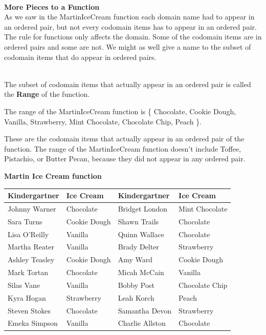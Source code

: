 \documentclass{ximera}
\begin{document}
\quad \\

\textbf{More Pieces to a Function} \\

As we saw in the MartinIceCream function each domain name had to appear in an ordered pair, but not every codomain items has to appear in an ordered pair. The rule for functions only affects the domain. Some of the codomain items are in ordered pairs and some are not. We might as well give a name to the subset of codomain items that do appear in ordered pairs.

\begin{definition}
\quad \\
The subset of codomain items that actually appear in an ordered pair is called the \textbf{Range} of the function.
\end{definition}


\begin{example}
The range of the MartinIceCream function is 
\{ Chocolate, Cookie Dough, Vanilla, Strawberry, Mint Chocolate, Chocolate Chip, Peach \}.

These are the codomain items that actually appear in an ordered pair of the function.  The range of the MartinIceCream function doesn't include Toffee, Pistachio, or Butter Pecan, because they did not appear in any ordered pair.
\end{example}




\textbf{Martin Ice Cream function} \\
\begin{center}

\begin{tabular}{|l|l|l|l|}
\hline
Kindergartner & Ice Cream & Kindergartner & Ice Cream \\\hline 
Johnny Warner & Chocolate & Bridget London & Mint Chocolate \\\hline 
Sara Turns & Cookie Dough & Shawn Trails & Chocolate \\\hline 
Lisa O'Reilly & Vanilla & Quinn Wallace & Chocolate \\\hline 
Martha Reater & Vanilla & Brady Delter & Strawberry \\\hline 
Ashley Teasley & Cookie Dough & Amy Ward & Cookie Dough \\\hline 
Mark Tortan & Chocolate & Micah McCain & Vanilla \\\hline 
Silas Vane & Vanilla & Bobby Post & Chocolate Chip \\\hline 
Kyra Hogan & Strawberry & Leah Korch & Peach \\\hline 
Steven Stokes & Chocolate & Samantha Devon & Strawberry \\\hline 
Emeka Simpson & Vanilla & Charlie Allston & Chocolate \\\hline 
\end{tabular}

\end{center}
\end{document}
